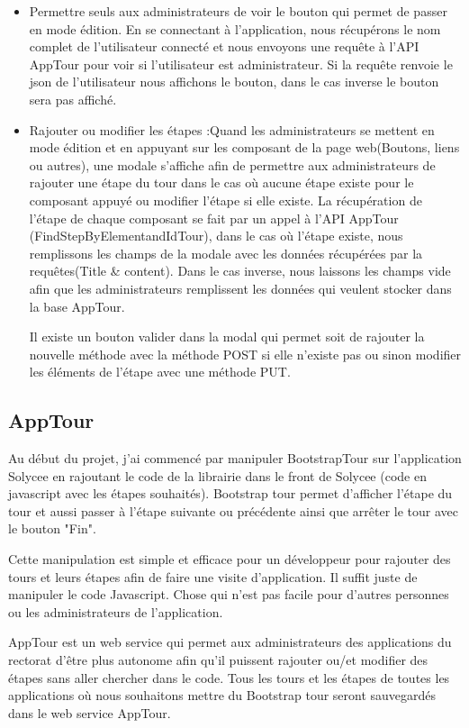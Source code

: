 \documentclass[12pt]{article}
\begin{document}
\begin{itemize}
\item Permettre seuls aux administrateurs de voir le bouton qui permet de passer en mode édition. En se connectant à l'application, nous récupérons le nom complet de l'utilisateur connecté et nous envoyons une requête à l'API AppTour pour voir si l'utilisateur est administrateur. Si la requête renvoie le json de l’utilisateur nous affichons le bouton, dans le cas inverse le bouton sera pas affiché. \newline

\item Rajouter ou modifier les étapes :Quand les administrateurs se mettent en mode édition et en appuyant sur les composant de la page web(Boutons, liens ou autres), une modale s'affiche afin de permettre aux administrateurs de rajouter une étape du tour dans le cas où aucune étape existe pour le composant appuyé ou modifier l'étape si elle existe.
La récupération de l'étape de chaque composant se fait par un appel à l'API AppTour (FindStepByElementandIdTour), dans le cas où l'étape existe, nous remplissons les champs de la modale avec les données récupérées par la requêtes(Title \& content). Dans le cas inverse, nous laissons les champs vide afin que les administrateurs remplissent les données qui veulent stocker dans la base AppTour.

Il existe un bouton valider dans la modal qui  permet soit de rajouter la nouvelle méthode avec la méthode POST si elle n'existe pas ou sinon modifier les éléments de l'étape avec une méthode PUT.
\end{itemize}

\subsection{AppTour}

Au début du projet, j'ai commencé par manipuler BootstrapTour sur l'application Solycee en rajoutant le code de la librairie dans le front de Solycee (code en javascript avec les étapes souhaités). Bootstrap tour permet d'afficher l'étape du tour et aussi passer à l'étape suivante ou précédente ainsi que arrêter le tour avec le bouton "Fin".

Cette manipulation est simple et efficace pour un développeur pour rajouter des tours et leurs étapes afin de faire une visite d'application. Il suffit juste de manipuler le code Javascript. Chose qui n'est pas facile pour d'autres personnes ou les administrateurs de l'application.

AppTour est un web service qui permet aux administrateurs des applications du rectorat d'être plus autonome afin qu'il puissent rajouter ou/et modifier des étapes sans aller chercher dans le code. Tous les tours et les étapes de toutes les applications où nous souhaitons mettre du Bootstrap tour seront sauvegardés dans le web service AppTour.
\end{document}
